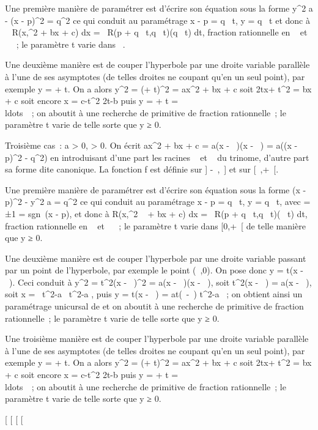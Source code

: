 Une première manière de paramétrer \Gamma est d'écrire son équation sous la
forme  y^2 \over a - (x - p)^2
= q^2 ce qui conduit au paramétrage x - p =
q\mathrmsh~ t, y =
q\sqrta\mathrmch~
t et donc à \int ~
R(x,\sqrtax^2  + bx + c) dx
=\int ~ R(p +
q\mathrmsh~
t,q\sqrta\mathrmch~
t)(q\mathrmch~ t) dt,
fraction rationnelle en
\mathrmsh~ et
\mathrmch~ ~; le paramètre t
varie dans ~.

Une deuxième manière est de couper l'hyperbole \Gamma par une droite variable
parallèle à l'une de ses asymptotes (de telles droites ne coupant \Gamma
qu'en un seul point), par exemple y = \sqrtax + t. On
a alors y^2 = (\sqrtax + t)^2 =
ax^2 + bx + c soit 2tx\sqrta +
t^2 = bx + c soit encore x = c-t^2
\over 2t\sqrta-b puis y =
\sqrtax + t =
\\ldots~~; on
aboutit à une recherche de primitive de fraction rationnelle~; le
paramètre t varie de telle sorte que y ≥ 0.

Troisième cas~: a \textgreater{} 0, \Delta \textgreater{} 0. On écrit
ax^2 + bx + c = a(x - \alpha~)(x - \beta~) = a((x - p)^2 -
q^2) en introduisant d'une part les racines \alpha~ et \beta~ du
trinome, d'autre part sa forme dite canonique. La fonction f est définie
sur {]} -\infty~,\alpha~{]} et sur {[}\beta~,+\infty~{[}.

Une première manière de paramétrer \Gamma est d'écrire son équation sous la
forme (x - p)^2 - y^2 \over a =
q^2 ce qui conduit au paramétrage x - p =
q\epsilon\mathrmch~ t, y =
q\sqrta\mathrmsh~
t, avec \epsilon = ±1 = sgn~(x - p), et donc à
\int  R(x,\sqrtax^2 ~
+ bx + c) dx =\int ~ R(p +
q\epsilon\mathrmch~
t,q\sqrta\mathrmsh~
t)(\epsilonq\mathrmsh~ t) dt,
fraction rationnelle en
\mathrmsh~ et
\mathrmch~ ~; le paramètre t
varie dans {[}0,+\infty~{[} de telle manière que y ≥ 0.

Une deuxième manière est de couper l'hyperbole \Gamma par une droite variable
passant par un point de l'hyperbole, par exemple le point (\alpha~,0). On pose
donc y = t(x - \alpha~). Ceci conduit à y^2 = t^2(x -
\alpha~)^2 = a(x - \alpha~)(x - \beta~), soit t^2(x - \alpha~) = a(x - \beta~),
soit x = \alpha~t^2-a\beta~ \over t^2-a ,
puis y = t(x - \alpha~) = at(\beta~-\alpha~) \over t^2-a ~;
on obtient ainsi un paramétrage unicursal de \Gamma et on aboutit à une
recherche de primitive de fraction rationnelle~; le paramètre t varie de
telle sorte que y ≥ 0.

Une troisième manière est de couper l'hyperbole \Gamma par une droite
variable parallèle à l'une de ses asymptotes (de telles droites ne
coupant \Gamma qu'en un seul point), par exemple y =
\sqrtax + t. On a alors y^2 =
(\sqrtax + t)^2 = ax^2 + bx + c
soit 2tx\sqrta + t^2 = bx + c soit encore
x = c-t^2 \over
2t\sqrta-b puis y = \sqrtax + t
= \\ldots~~; on
aboutit à une recherche de primitive de fraction rationnelle~; le
paramètre t varie de telle sorte que y ≥ 0.

{[}
{[}
{[}
{[}
